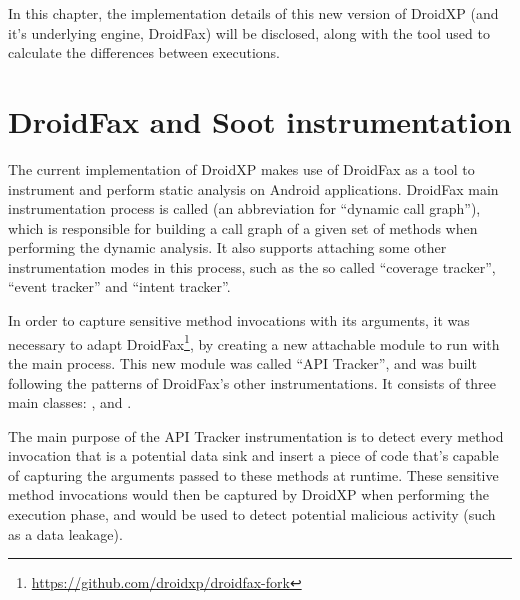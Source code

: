 
In this chapter, the implementation details of this new version of DroidXP (and it's underlying engine, DroidFax) will be disclosed, along with the tool used to calculate the differences between executions.

\section{DroidFax and Soot instrumentation}

The current implementation of DroidXP makes use of DroidFax as a tool to instrument and perform static analysis on Android applications. DroidFax main instrumentation process is called  (an abbreviation for ``dynamic call graph''), which is responsible for building a call graph of a given set of methods when performing the dynamic analysis. It also supports attaching some other instrumentation modes in this process, such as the so called ``coverage tracker'', ``event tracker'' and ``intent tracker''.

In order to capture sensitive method invocations with its arguments, it was necessary to adapt DroidFax\footnote{\url{https://github.com/droidxp/droidfax-fork}}, by creating a new attachable module to run with the main process. This new module was called ``API Tracker'', and was built following the patterns of DroidFax's other instrumentations. It consists of three main classes: ,  and .

The main purpose of the API Tracker instrumentation is to detect every method invocation that is a potential data sink and insert a piece of code that's capable of capturing the arguments passed to these methods at runtime. These sensitive method invocations would then be captured by DroidXP when performing the execution phase, and would be used to detect potential malicious activity (such as a data leakage).

